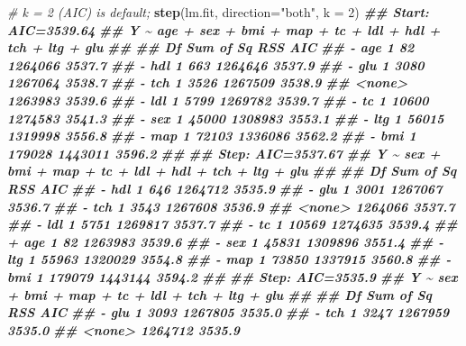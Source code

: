 \documentclass[
]{book}
\newenvironment{Shaded}{\begin{snugshade}}{\end{snugshade}}
\newcommand{\AttributeTok}[1]{\textcolor[rgb]{0.13,0.29,0.53}{#1}}
\newcommand{\CommentTok}[1]{\textcolor[rgb]{0.56,0.35,0.01}{\textit{#1}}}
\newcommand{\DecValTok}[1]{\textcolor[rgb]{0.00,0.00,0.81}{#1}}
\newcommand{\DocumentationTok}[1]{\textcolor[rgb]{0.56,0.35,0.01}{\textbf{\textit{#1}}}}
\newcommand{\FunctionTok}[1]{\textcolor[rgb]{0.13,0.29,0.53}{\textbf{#1}}}
\newcommand{\NormalTok}[1]{#1}
\newcommand{\StringTok}[1]{\textcolor[rgb]{0.31,0.60,0.02}{#1}}
\theoremstyle{definition}
\theoremstyle{definition}
\theoremstyle{definition}
\theoremstyle{definition}
\theoremstyle{remark}
\begin{document}
\begin{Shaded}
\begin{Highlighting}[]
    \CommentTok{\# k = 2 (AIC) is default; }
    \FunctionTok{step}\NormalTok{(lm.fit, }\AttributeTok{direction=}\StringTok{"both"}\NormalTok{, }\AttributeTok{k =} \DecValTok{2}\NormalTok{)}
\DocumentationTok{\#\# Start:  AIC=3539.64}
\DocumentationTok{\#\# Y \textasciitilde{} age + sex + bmi + map + tc + ldl + hdl + tch + ltg + glu}
\DocumentationTok{\#\# }
\DocumentationTok{\#\#        Df Sum of Sq     RSS    AIC}
\DocumentationTok{\#\# {-} age   1        82 1264066 3537.7}
\DocumentationTok{\#\# {-} hdl   1       663 1264646 3537.9}
\DocumentationTok{\#\# {-} glu   1      3080 1267064 3538.7}
\DocumentationTok{\#\# {-} tch   1      3526 1267509 3538.9}
\DocumentationTok{\#\# \textless{}none\textgreater{}              1263983 3539.6}
\DocumentationTok{\#\# {-} ldl   1      5799 1269782 3539.7}
\DocumentationTok{\#\# {-} tc    1     10600 1274583 3541.3}
\DocumentationTok{\#\# {-} sex   1     45000 1308983 3553.1}
\DocumentationTok{\#\# {-} ltg   1     56015 1319998 3556.8}
\DocumentationTok{\#\# {-} map   1     72103 1336086 3562.2}
\DocumentationTok{\#\# {-} bmi   1    179028 1443011 3596.2}
\DocumentationTok{\#\# }
\DocumentationTok{\#\# Step:  AIC=3537.67}
\DocumentationTok{\#\# Y \textasciitilde{} sex + bmi + map + tc + ldl + hdl + tch + ltg + glu}
\DocumentationTok{\#\# }
\DocumentationTok{\#\#        Df Sum of Sq     RSS    AIC}
\DocumentationTok{\#\# {-} hdl   1       646 1264712 3535.9}
\DocumentationTok{\#\# {-} glu   1      3001 1267067 3536.7}
\DocumentationTok{\#\# {-} tch   1      3543 1267608 3536.9}
\DocumentationTok{\#\# \textless{}none\textgreater{}              1264066 3537.7}
\DocumentationTok{\#\# {-} ldl   1      5751 1269817 3537.7}
\DocumentationTok{\#\# {-} tc    1     10569 1274635 3539.4}
\DocumentationTok{\#\# + age   1        82 1263983 3539.6}
\DocumentationTok{\#\# {-} sex   1     45831 1309896 3551.4}
\DocumentationTok{\#\# {-} ltg   1     55963 1320029 3554.8}
\DocumentationTok{\#\# {-} map   1     73850 1337915 3560.8}
\DocumentationTok{\#\# {-} bmi   1    179079 1443144 3594.2}
\DocumentationTok{\#\# }
\DocumentationTok{\#\# Step:  AIC=3535.9}
\DocumentationTok{\#\# Y \textasciitilde{} sex + bmi + map + tc + ldl + tch + ltg + glu}
\DocumentationTok{\#\# }
\DocumentationTok{\#\#        Df Sum of Sq     RSS    AIC}
\DocumentationTok{\#\# {-} glu   1      3093 1267805 3535.0}
\DocumentationTok{\#\# {-} tch   1      3247 1267959 3535.0}
\DocumentationTok{\#\# \textless{}none\textgreater{}              1264712 3535.9}

\end{Highlighting}
\end{Shaded}
\end{document}
